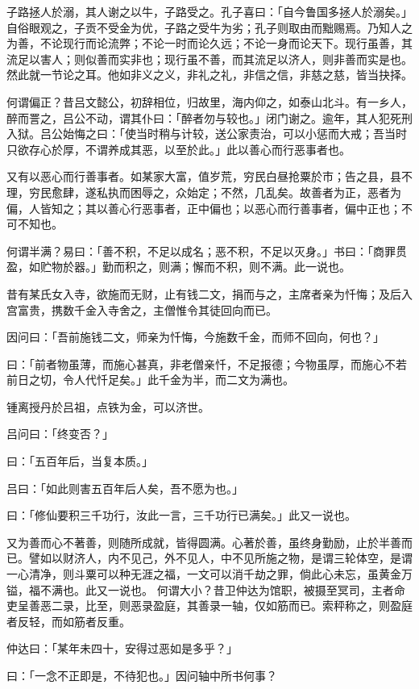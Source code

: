 \documentclass[letterpaper,12pt,english]{sphinxmanual}
\begin{document}
子路拯人於溺，其人谢之以牛，子路受之。孔子喜曰：「自今鲁国多拯人於溺矣。」自俗眼观之，子贡不受金为优，子路之受牛为劣；孔子则取由而黜赐焉。乃知人之为善，不论现行而论流弊；不论一时而论久远；不论一身而论天下。现行虽善，其流足以害人；则似善而实非也；现行虽不善，而其流足以济人，则非善而实是也。然此就一节论之耳。他如非义之义，非礼之礼，非信之信，非慈之慈，皆当抉择。

何谓偏正？昔吕文懿公，初辞相位，归故里，海内仰之，如泰山北斗。有一乡人，醉而詈之，吕公不动，谓其仆曰：「醉者勿与较也。」闭门谢之。逾年，其人犯死刑入狱。吕公始悔之曰：「使当时稍与计较，送公家责治，可以小惩而大戒；吾当时只欲存心於厚，不谓养成其恶，以至於此。」此以善心而行恶事者也。

又有以恶心而行善事者。如某家大富，值岁荒，穷民白昼抢粟於市；告之县，县不理，穷民愈肆，遂私执而困辱之，众始定；不然，几乱矣。故善者为正，恶者为偏，人皆知之；其以善心行恶事者，正中偏也；以恶心而行善事者，偏中正也；不可不知也。

何谓半满？易曰：「善不积，不足以成名；恶不积，不足以灭身。」书曰：「商罪贯盈，如贮物於器。」勤而积之，则满；懈而不积，则不满。此一说也。

昔有某氏女入寺，欲施而无财，止有钱二文，捐而与之，主席者亲为忏悔；及后入宫富贵，携数千金入寺舍之，主僧惟令其徒回向而已。

因问曰：「吾前施钱二文，师亲为忏悔，今施数千金，而师不回向，何也？」

曰：「前者物虽薄，而施心甚真，非老僧亲忏，不足报德；今物虽厚，而施心不若前日之切，令人代忏足矣。」此千金为半，而二文为满也。

锺离授丹於吕祖，点铁为金，可以济世。

吕问曰：「终变否？」

曰：「五百年后，当复本质。」

吕曰：「如此则害五百年后人矣，吾不愿为也。」

曰：「修仙要积三千功行，汝此一言，三千功行已满矣。」此又一说也。

又为善而心不著善，则随所成就，皆得圆满。心著於善，虽终身勤励，止於半善而已。譬如以财济人，内不见己，外不见人，中不见所施之物，是谓三轮体空，是谓一心清净，则斗粟可以种无涯之福，一文可以消千劫之罪，倘此心未忘，虽黄金万镒，福不满也。此又一说也。 何谓大小？昔卫仲达为馆职，被摄至冥司，主者命吏呈善恶二录，比至，则恶录盈庭，其善录一轴，仅如筋而已。索秤称之，则盈庭者反轻，而如筋者反重。

仲达曰：「某年未四十，安得过恶如是多乎？」

曰：「一念不正即是，不待犯也。」因问轴中所书何事？
\end{document}
